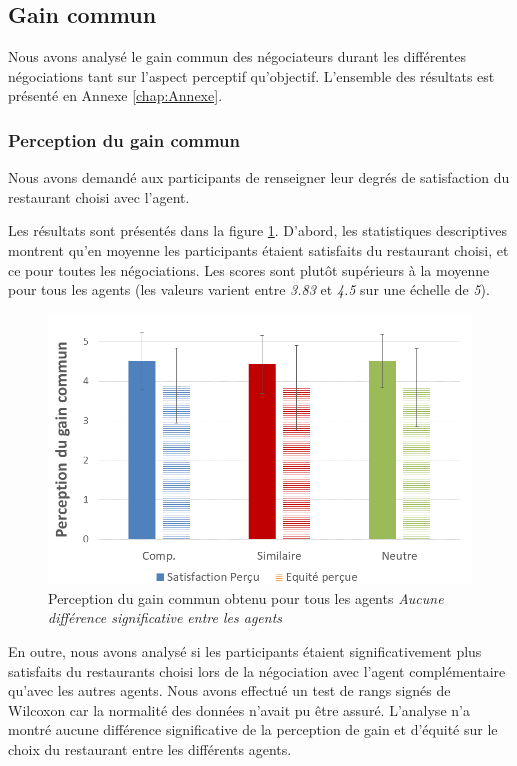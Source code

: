 	\subsection{Gain commun}
		Nous avons analysé le gain commun des négociateurs durant les différentes négociations tant sur l'aspect perceptif qu'objectif. L'ensemble des résultats est présenté en Annexe \ref{chap:Annexe}.
		
		\subsubsection{Perception du gain commun} Nous avons demandé aux participants de renseigner leur degrés de satisfaction du restaurant choisi avec l'agent.
		 
		Les résultats sont présentés dans la figure \ref{fig:gainCom}. D'abord, les statistiques descriptives montrent qu'en moyenne les participants étaient satisfaits du restaurant choisi, et ce pour toutes les négociations. Les scores sont plutôt supérieurs à la moyenne pour tous les agents (les valeurs varient entre \emph{3.83} et \emph{4.5} sur une échelle de \emph{5}). 
		
		\begin{figure}

		\centering
		\includegraphics[width= 0.65 \linewidth,clip=false]{Figures/chap7/percpGain.PNG}
		\caption{Perception du gain commun obtenu pour tous les agents \textit{Aucune différence significative entre les agents}}
		\label{fig:gainCom}
		\end{figure}
		
		En outre, nous avons analysé si les participants étaient significativement plus satisfaits du restaurants choisi lors de la négociation avec l'agent complémentaire qu'avec les autres agents. Nous avons effectué un test de rangs signés de Wilcoxon car la normalité des données n'avait pu être assuré. L'analyse n'a montré aucune différence significative de la perception de gain et d'équité sur le choix du restaurant entre les différents agents. 
		
